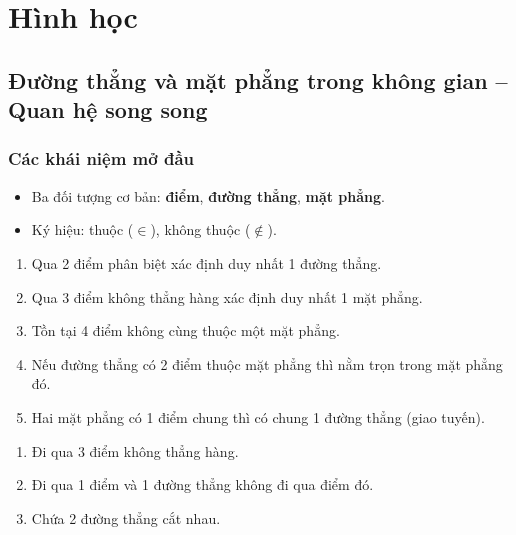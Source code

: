 \documentclass[12pt,a4paper]{article}
\begin{document}
\section{Hình học}

\subsection{Đường thẳng và mặt phẳng trong không gian -- Quan hệ song song}

\subsubsection{Các khái niệm mở đầu}

\begin{dinhnghia}
  \begin{itemize}
    \item Ba đối tượng cơ bản: \textbf{điểm}, \textbf{đường thẳng}, \textbf{mặt phẳng}.
    \item Ký hiệu: thuộc ($\in$), không thuộc ($\notin$).
  \end{itemize}
\end{dinhnghia}

\begin{dinhly}[title={Các tính chất thừa nhận (tiên đề)}]
  \begin{enumerate}
    \item Qua 2 điểm phân biệt xác định duy nhất 1 đường thẳng.
    \item Qua 3 điểm không thẳng hàng xác định duy nhất 1 mặt phẳng.
    \item Tồn tại 4 điểm không cùng thuộc một mặt phẳng.
    \item Nếu đường thẳng có 2 điểm thuộc mặt phẳng thì nằm trọn trong mặt phẳng đó.
    \item Hai mặt phẳng có 1 điểm chung thì có chung 1 đường thẳng (giao tuyến).
  \end{enumerate}
\end{dinhly}

\begin{tinhchat}[title={Cách xác định mặt phẳng}]
  \begin{enumerate}
    \item Đi qua 3 điểm không thẳng hàng.
    \item Đi qua 1 điểm và 1 đường thẳng không đi qua điểm đó.
    \item Chứa 2 đường thẳng cắt nhau.
  \end{enumerate}
\end{tinhchat}
\end{document}
